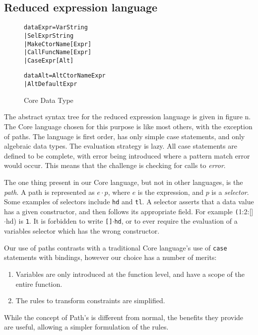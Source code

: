 \documentclass[preprint]{sigplanconf}
\newcommand{\T}[1]{\texttt{#1}}
\newenvironment{code}{\begin{alltt}\small}{\end{alltt}}
\newcommand{\D}{\ensuremath{\cdot}} %
\begin{document}
\subsection{Reduced expression language}

\begin{figure}
\begin{code}
data Expr = Var String
          | Sel Expr String
          | Make CtorName [Expr]
          | Call FuncName [Expr]
          | Case Expr [Alt]

data Alt = Alt CtorName Expr
         | AltDefault Expr
\end{code}
\caption{Core Data Type}
\label{fig:core}
\end{figure}

The abstract syntax tree for the reduced expression language is given in figure n.
The Core language chosen for this purpose is like most others, with the
exception of paths. The language is first order, has only simple case
statements, and only algebraic data types. The evaluation strategy is lazy. All
case statements are defined to be complete, with error being introduced where a
pattern match error would occur. This means that the challenge is checking for
calls to \textit{error}.

The one thing present in our Core language, but not in other languages, is the
\textit{path}. A path is represented as $e\D{}p$, where $e$ is the expression,
and $p$ is a \textit{selector}. Some examples of selectors include \T{hd} and
\T{tl}. A selector asserts that a data value has a given constructor, and then
follows its appropriate field. For example \T(1:2:[]\D{}hd) is \T{1}. It is
forbidden to write \T{[]\D{}hd}, or to ever require the evaluation of a
variables selector which has the wrong constructor.

Our use of paths contrasts with a traditional Core language's use of \T{case}
statements with bindings, however our choice has a number of merits:

\begin{enumerate}
\item Variables are only introduced at the function level, and have a scope of the entire function.
\item The rules to transform constraints are simplified.
\end{enumerate}

While the concept of Path's is different from normal, the benefits they provide are useful, allowing a simpler formulation of the rules.
\end{document}

